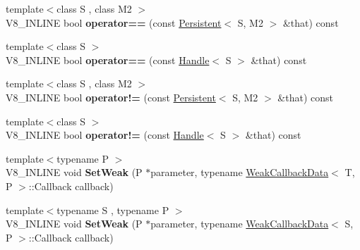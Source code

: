 \begin{DoxyCompactItemize}
\item 
\hypertarget{classv8_1_1_persistent_a41962af8e4363b8596ad18f0a48732bd}{}{\footnotesize template$<$class S , class M2 $>$ }\\V8\+\_\+\+I\+N\+L\+I\+N\+E bool {\bfseries operator==} (const \hyperlink{classv8_1_1_persistent}{Persistent}$<$ S, M2 $>$ \&that) const \label{classv8_1_1_persistent_a41962af8e4363b8596ad18f0a48732bd}

\item 
\hypertarget{classv8_1_1_persistent_aeff86d7ea8a95aa363e507babc873bd3}{}{\footnotesize template$<$class S $>$ }\\V8\+\_\+\+I\+N\+L\+I\+N\+E bool {\bfseries operator==} (const \hyperlink{classv8_1_1_handle}{Handle}$<$ S $>$ \&that) const \label{classv8_1_1_persistent_aeff86d7ea8a95aa363e507babc873bd3}

\item 
\hypertarget{classv8_1_1_persistent_a54c04c2cfdb13a7af2ba5de1591cb941}{}{\footnotesize template$<$class S , class M2 $>$ }\\V8\+\_\+\+I\+N\+L\+I\+N\+E bool {\bfseries operator!=} (const \hyperlink{classv8_1_1_persistent}{Persistent}$<$ S, M2 $>$ \&that) const \label{classv8_1_1_persistent_a54c04c2cfdb13a7af2ba5de1591cb941}

\item 
\hypertarget{classv8_1_1_persistent_a391f3d39db1f9950a89b97509411f76d}{}{\footnotesize template$<$class S $>$ }\\V8\+\_\+\+I\+N\+L\+I\+N\+E bool {\bfseries operator!=} (const \hyperlink{classv8_1_1_handle}{Handle}$<$ S $>$ \&that) const \label{classv8_1_1_persistent_a391f3d39db1f9950a89b97509411f76d}

\item 
\hypertarget{classv8_1_1_persistent_a64018567a9080bfd9e63435a2e8bb97d}{}{\footnotesize template$<$typename P $>$ }\\V8\+\_\+\+I\+N\+L\+I\+N\+E void {\bfseries Set\+Weak} (P $\ast$parameter, typename \hyperlink{classv8_1_1_weak_callback_data}{Weak\+Callback\+Data}$<$ T, P $>$\+::Callback callback)\label{classv8_1_1_persistent_a64018567a9080bfd9e63435a2e8bb97d}

\item 
\hypertarget{classv8_1_1_persistent_a897423b1a6e79f1f01330fb8c7c1fbd0}{}{\footnotesize template$<$typename S , typename P $>$ }\\V8\+\_\+\+I\+N\+L\+I\+N\+E void {\bfseries Set\+Weak} (P $\ast$parameter, typename \hyperlink{classv8_1_1_weak_callback_data}{Weak\+Callback\+Data}$<$ S, P $>$\+::Callback callback)\label{classv8_1_1_persistent_a897423b1a6e79f1f01330fb8c7c1fbd0}


\end{DoxyCompactItemize}
